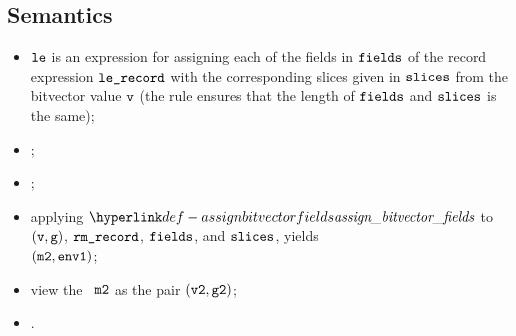 \begin{mathpar}
\end{mathpar}

\subsection{Semantics}
\ProseParagraph
\AllApply
\begin{itemize}
  \item $\vle$ is an expression for assigning each of the fields in $\fields$ of the record expression $\vlerecord$
        with the corresponding slices given in $\vslices$ from the bitvector value $\vv$
        (the rule  ensures that the length of $\fields$ and $\vslices$ is the same);
  \item {}\ProseOrAbnormal;
  \item \Proseeqdef{$\vm$}{$(\vv,\vg)$};
  \item applying $\assignbitvectorfields$ to $(\vv,\vg)$, $\vrmrecord$, $\fields$, and $\vslices$, yields \\
        $(\vmtwo, \envone)$\ProseOrError;
  \item view the \concurrentnativevalue\ $\vmtwo$ as the pair $(\vvtwo, \vgtwo)$;
  \item {}.
\end{itemize}

